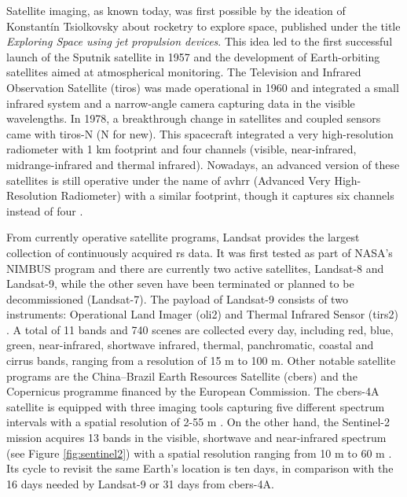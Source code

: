 Satellite imaging, as known today, was first possible by the ideation of Konstantín Tsiolkovsky about rocketry to explore space, published under the title \textit{Exploring Space using jet propulsion devices}. This idea led to the first successful launch of the Sputnik satellite in 1957 and the development of Earth-orbiting satellites aimed at atmospherical monitoring. The Television and Infrared Observation Satellite (\acrshort{tiros}) was made operational in 1960 and integrated a small infrared system and a narrow-angle camera capturing data in the visible wavelengths. In 1978, a breakthrough change in satellites and coupled sensors came with \acrshort{tiros}-N (N for new). This spacecraft integrated a very high-resolution radiometer with 1 \si{\kilo\meter} footprint and four channels (visible, near-infrared, midrange-infrared and thermal infrared). Nowadays, an advanced version of these satellites is still operative under the name of \acrshort{avhrr} (Advanced Very High-Resolution Radiometer) with a similar footprint, though it captures six channels instead of four \cite{national_oceanic_and_atmospheric_administration_avhrr3_nodate}.   

From currently operative satellite programs, Landsat provides the largest collection of continuously acquired \acrshort{rs} data. It was first tested as part of NASA's NIMBUS program and there are currently two active satellites, Landsat-8 and Landsat-9, while the other seven have been terminated or planned to be decommissioned (Landsat-7). The payload of Landsat-9 consists of two instruments: Operational Land Imager (\acrshort{oli2}) and Thermal Infrared Sensor (\acrshort{tirs2}) \cite{masek_landsat_2020, nasa_earth_observatory_landsat_2021-1, us_geological_survey_landsat_2019}. A total of 11 bands and 740 scenes are collected every day, including red, blue, green, near-infrared, shortwave infrared, thermal, panchromatic, coastal and cirrus bands, ranging from a resolution of 15 \si{\meter} to 100 \si{\meter}. Other notable satellite programs are the China–Brazil Earth Resources Satellite (\acrshort{cbers}) and the Copernicus programme financed by the European Commission. The \acrshort{cbers}-4A satellite is equipped with three imaging tools capturing five different spectrum intervals with a spatial resolution of 2-55 \si{\meter} \cite{instituto_nacional_de_pesquisas_espaciais_inpecbers_2019}. On the other hand, the Sentinel-2 mission acquires 13 bands in the visible, shortwave and near-infrared spectrum (see Figure \ref{fig:sentinel2}) with a spatial resolution ranging from 10 \si{\meter} to 60 \si{\meter} \cite{european_environment_agency_eu_2017}. Its cycle to revisit the same Earth's location is ten days, in comparison with the 16 days needed by Landsat-9 or 31 days from \acrshort{cbers}-4A.

